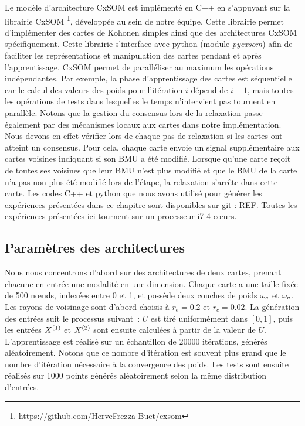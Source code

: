 \documentclass[../main]{subfiles}
\begin{document}
Le modèle d'architecture CxSOM est implémenté en C++ en s'appuyant sur la librairie CxSOM \footnote{\url{https://github.com/HerveFrezza-Buet/cxsom}}, développée au sein de notre équipe.
Cette librairie permet d'implémenter des cartes de Kohonen simples ainsi que des architectures CxSOM spécifiquement.
Cette librairie s'interface avec python (module \emph{pycxsom}) afin de faciliter les représentations et manipulation des cartes pendant et après l'apprentissage. 
CxSOM permet de paralléliser au maximum les opérations indépendantes. Par exemple, la phase d'apprentissage des cartes est séquentielle car le calcul des valeurs des poids pour l'itération $i$ dépend de $i-1$, mais toutes les opérations de tests dans lesquelles le temps n'intervient pas tournent en parallèle.
Notons que la gestion du consensus lors de la relaxation passe également par des mécanismes locaux aux cartes dans notre implémentation. 
Nous devons en effet vérifier lors de chaque pas de relaxation si les cartes ont atteint un consensus. Pour cela, chaque carte envoie un signal supplémentaire aux cartes voisines indiquant si son BMU a été modifié. Lorsque qu'une carte reçoit de toutes ses voisines que leur BMU n'est plus modifié et que le BMU de la carte n'a pas non plus été modifié lors de l'étape, la relaxation s'arrête dans cette carte.
Les codes C++ et python que nous avons utilisé pour générer les expériences présentées dans ce chapitre sont disponibles sur git : REF.
Toutes les expériences présentées ici tournent sur un processeur i7 4 c\oe{}urs.

\subsection{Paramètres des architectures}

Nous nous concentrons d'abord sur des architectures de deux cartes, prenant chacune en entrée une modalité en une dimension.
Chaque carte a une taille fixée de 500 n\oe{}uds, indexées entre 0 et 1, et possède deux couches de poids $\omega_e$ et $\omega_c$. Les rayons de voisinage sont d'abord choisis à $r_e = 0.2$ et $r_c = 0.02$.
La génération des entrées suit le processus suivant~: $U$ est tiré uniformément dans $[0,1]$, puis les entrées $X^{({1})}$ et $X^{({2})}$ sont ensuite calculées à partir de la valeur de $U$. 
L'apprentissage est réalisé sur un échantillon de 20000 itérations, générés aléatoirement. Notons que ce nombre d'itération est souvent plus grand que le nombre d'itération nécessaire à la convergence des poids.
Les tests sont ensuite réalisés sur 1000 points générés aléatoirement selon la même distribution d'entrées.
\end{document}
